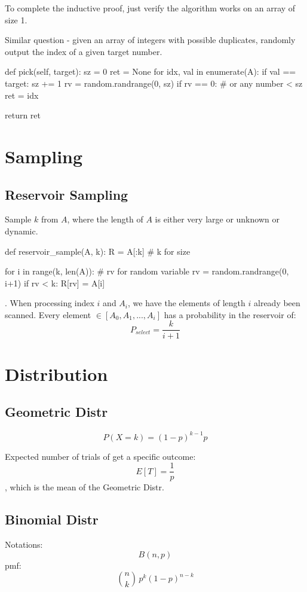 To complete the inductive proof, just verify the algorithm works on an array of size 1.

 Similar question - given an array of integers with possible duplicates, randomly output the index of a given target number.
\begin{python}
def pick(self, target):
    sz = 0
    ret = None
    for idx, val in enumerate(A):
        if val == target:
            sz += 1
            rv = random.randrange(0, sz)
            if rv == 0:  # or any number < sz
                ret = idx

    return ret
\end{python}

\section{Sampling}
\subsection{Reservoir Sampling}
Sample $k$ from $A$, where the length of $A$ is either very large or unknown or dynamic. 
\begin{python}
def reservoir_sample(A, k):
  R = A[:k]  # k for size
  
  for i in range(k, len(A)):
    # rv for random variable
    rv = random.randrange(0, i+1)
    if rv < k:
      R[rv] = A[i]
\end{python}
. 
When processing index $i$ and $A_i$, we have the elements of length $i$ already been scanned. Every element $\in [A_0, A_1, ..., A_i]$ has a probability in the reservoir of:
$$
P_{select} = \frac{k}{i+1}
$$

\section{Distribution}
\subsection{Geometric Distr}
$$
P(X=k) = (1-p)^{k-1}p
$$

Expected number of trials of get a specific outcome:
$$
E[T] = \frac{1}{p}
$$
, which is the mean of the Geometric Distr. 
\subsection{Binomial Distr}
Notations:
$$
B(n, p)
$$
pmf:
$$
{n \choose k}\,p^{k}(1-p)^{n-k}
$$

